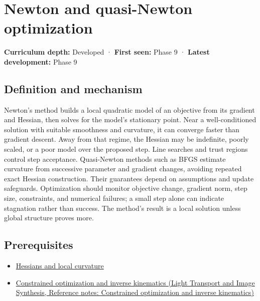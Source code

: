 \hypertarget{appendix-54c8f5828387}{}\label{referencestart:appendix-54c8f5828387}
\section{Newton and quasi-Newton optimization}\label{appendix-54c8f5828387-newton-and-quasi-newton-optimization}

\textbf{Curriculum depth:} Developed · \textbf{First seen:} Phase 9 · \textbf{Latest development:} Phase 9

\begin{allmightroledefinition}

\subsection{Definition and mechanism}\label{appendix-54c8f5828387-definition-and-mechanism}

Newton's method builds a local quadratic model of an objective from its gradient and Hessian, then solves for the model's stationary point. Near a well-conditioned solution with suitable smoothness and curvature, it can converge faster than gradient descent. Away from that regime, the Hessian may be indefinite, poorly scaled, or a poor model over the proposed step. Line searches and trust regions control step acceptance. Quasi-Newton methods such as BFGS estimate curvature from successive parameter and gradient changes, avoiding repeated exact Hessian construction. Their guarantees depend on assumptions and update safeguards. Optimization should monitor objective change, gradient norm, step size, constraints, and numerical failures; a small step alone can indicate stagnation rather than success. The method's result is a local solution unless global structure proves more.

\end{allmightroledefinition}

\subsection{Prerequisites}\label{appendix-54c8f5828387-prerequisites}

\begin{itemize}
\tightlist
\item
  \hyperref[appendix-6ac071f8b50c]{Hessians and local curvature}
\item
  \href{../04-Light-Transport-and-Image-Synthesis/main.pdf\#nameddest=appendix-29f4bea4c2bb}{Constrained optimization and inverse kinematics (Light Transport and Image Synthesis, Reference notes: Constrained optimization and inverse kinematics)}
\end{itemize}

